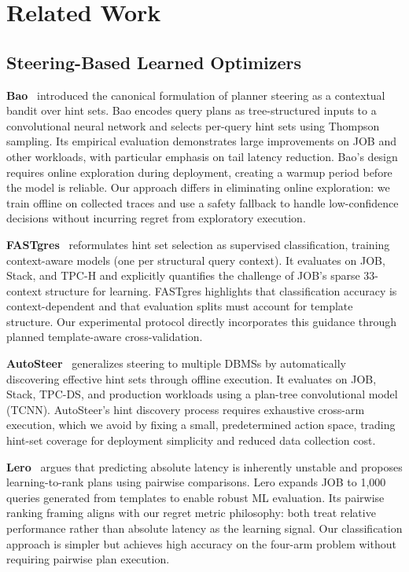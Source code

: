 \documentclass[sigconf,natbib=false]{article}
\begin{document}
\section{Related Work}
\label{sec:related}

\subsection{Steering-Based Learned Optimizers}

\textbf{Bao}~\cite{Marcus2021Bao} introduced the canonical formulation of planner steering as
a contextual bandit over hint sets. Bao encodes query plans as tree-structured inputs to a
convolutional neural network and selects per-query hint sets using Thompson sampling. Its
empirical evaluation demonstrates large improvements on JOB and other workloads, with
particular emphasis on tail latency reduction. Bao's design requires online exploration during
deployment, creating a warmup period before the model is reliable. Our approach differs in
eliminating online exploration: we train offline on collected traces and use a safety fallback
to handle low-confidence decisions without incurring regret from exploratory execution.

\textbf{FASTgres}~\cite{Habich2023} reformulates hint set selection as supervised
classification, training context-aware models (one per structural query context). It evaluates
on JOB, Stack, and TPC-H and explicitly quantifies the challenge of JOB's sparse 33-context
structure for learning. FASTgres highlights that classification accuracy is context-dependent
and that evaluation splits must account for template structure. Our experimental protocol
directly incorporates this guidance through planned template-aware cross-validation.

\textbf{AutoSteer}~\cite{Anneser2023} generalizes steering to multiple DBMSs by automatically
discovering effective hint sets through offline execution. It evaluates on JOB, Stack, TPC-DS,
and production workloads using a plan-tree convolutional model (TCNN). AutoSteer's hint
discovery process requires exhaustive cross-arm execution, which we avoid by fixing a small,
predetermined action space, trading hint-set coverage for deployment simplicity and reduced
data collection cost.

\textbf{Lero}~\cite{Zhu2023Lero} argues that predicting absolute latency is inherently
unstable and proposes learning-to-rank plans using pairwise comparisons. Lero expands JOB to
1{,}000 queries generated from templates to enable robust ML evaluation. Its pairwise ranking
framing aligns with our regret metric philosophy: both treat relative performance rather than
absolute latency as the learning signal. Our classification approach is simpler but achieves
high accuracy on the four-arm problem without requiring pairwise plan execution.
\end{document}
